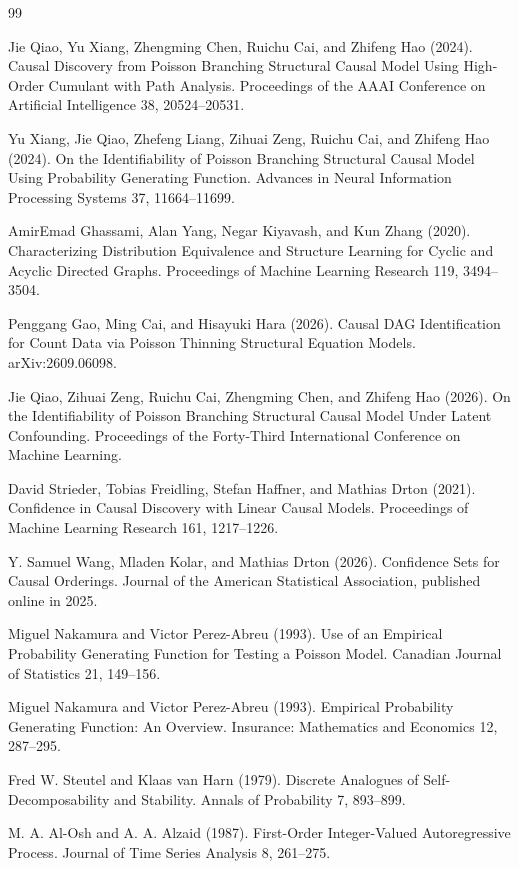 \documentclass{article}
\begin{document}
\begin{thebibliography}{99}

   Jie Qiao, Yu Xiang, Zhengming Chen, Ruichu Cai, and Zhifeng Hao (2024). Causal Discovery from Poisson Branching Structural Causal Model Using High-Order Cumulant with Path Analysis. Proceedings of the AAAI Conference on Artificial Intelligence 38, 20524--20531.

   Yu Xiang, Jie Qiao, Zhefeng Liang, Zihuai Zeng, Ruichu Cai, and Zhifeng Hao (2024). On the Identifiability of Poisson Branching Structural Causal Model Using Probability Generating Function. Advances in Neural Information Processing Systems 37, 11664--11699.

   AmirEmad Ghassami, Alan Yang, Negar Kiyavash, and Kun Zhang (2020). Characterizing Distribution Equivalence and Structure Learning for Cyclic and Acyclic Directed Graphs. Proceedings of Machine Learning Research 119, 3494--3504.

   Penggang Gao, Ming Cai, and Hisayuki Hara (2026). Causal DAG Identification for Count Data via Poisson Thinning Structural Equation Models. arXiv:2609.06098.

   Jie Qiao, Zihuai Zeng, Ruichu Cai, Zhengming Chen, and Zhifeng Hao (2026). On the Identifiability of Poisson Branching Structural Causal Model Under Latent Confounding. Proceedings of the Forty-Third International Conference on Machine Learning.

   David Strieder, Tobias Freidling, Stefan Haffner, and Mathias Drton (2021). Confidence in Causal Discovery with Linear Causal Models. Proceedings of Machine Learning Research 161, 1217--1226.

   Y. Samuel Wang, Mladen Kolar, and Mathias Drton (2026). Confidence Sets for Causal Orderings. Journal of the American Statistical Association, published online in 2025.

   Miguel Nakamura and Victor Perez-Abreu (1993). Use of an Empirical Probability Generating Function for Testing a Poisson Model. Canadian Journal of Statistics 21, 149--156.

   Miguel Nakamura and Victor Perez-Abreu (1993). Empirical Probability Generating Function: An Overview. Insurance: Mathematics and Economics 12, 287--295.

   Fred W. Steutel and Klaas van Harn (1979). Discrete Analogues of Self-Decomposability and Stability. Annals of Probability 7, 893--899.

   M. A. Al-Osh and A. A. Alzaid (1987). First-Order Integer-Valued Autoregressive Process. Journal of Time Series Analysis 8, 261--275.

\end{thebibliography}
\end{document}
